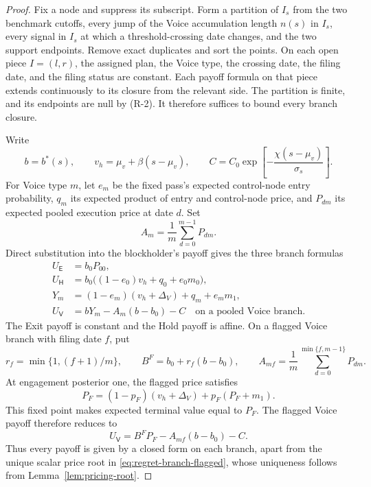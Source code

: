 \begin{proof}
Fix a node and suppress its subscript. Form a partition of $I_s$ from the two benchmark cutoffs,
every jump of the Voice accumulation length $n(s)$ in $I_s$, every signal in $I_s$ at which a
threshold-crossing date changes, and the two support endpoints. Remove exact duplicates and sort the
points. On each open
piece $I=(l,r)$, the assigned plan, the Voice type, the crossing date, the filing date, and the
filing status are constant. Each payoff formula on that piece extends continuously to its closure
from the relevant side. The partition is finite, and its endpoints are null by (R-2). It therefore
suffices to bound every branch closure.

Write
\[
b=b^*(s),
\qquad
v_h=\mu_v+\beta(s-\mu_v),
\qquad
C=C_0\exp\!\left[-\frac{\chi(s-\mu_v)}{\sigma_s}\right].
\]
For Voice type $m$, let $e_m$ be the fixed pass's expected control-node entry probability,
$q_m$ its expected product of entry and control-node price, and $P_{dm}$ its expected pooled
execution price at date $d$. Set
\[
A_m=\frac1m\sum_{d=0}^{m-1}P_{dm}.
\]
Direct substitution into the blockholder's payoff gives the three branch formulas
\begin{align}
\label{eq:regret-branches-pooled}
U_{\mathsf{E}}&=b_0P_{00},
\nonumber\\
U_{\mathsf{H}}&=b_0\bigl((1-e_0)v_h+q_0+e_0m_0\bigr),
\\
Y_m&=(1-e_m)(v_h+\Delta_V)+q_m+e_m m_1,
\nonumber\\
U_{\mathsf{V}}&=bY_m-A_m(b-b_0)-C
\quad\text{on a pooled Voice branch}.
\nonumber
\end{align}
The Exit payoff is constant and the Hold payoff is affine. On a flagged Voice branch with filing
date $f$, put
\[
r_f=\min\{1,(f+1)/m\},
\qquad
B^F=b_0+r_f(b-b_0),
\qquad
A_{mf}=\frac1m\sum_{d=0}^{\min\{f,m-1\}}P_{dm}.
\]
At engagement posterior one, the flagged price satisfies
\[
P_F=(1-p_F)(v_h+\Delta_V)+p_F(P_F+m_1).
\]
This fixed point makes expected terminal value equal to $P_F$. The flagged Voice payoff therefore
reduces to
\begin{equation}
\label{eq:regret-branch-flagged}
U_{\mathsf{V}}=B^FP_F-A_{mf}(b-b_0)-C.
\end{equation}
Thus every payoff is given by a closed form on each branch, apart from the unique scalar price root
in \eqref{eq:regret-branch-flagged}, whose uniqueness follows from Lemma~\ref{lem:pricing-root}.


\end{proof}
